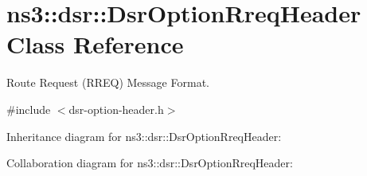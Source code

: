 \hypertarget{classns3_1_1dsr_1_1DsrOptionRreqHeader}{}\section{ns3\+:\+:dsr\+:\+:Dsr\+Option\+Rreq\+Header Class Reference}
\label{classns3_1_1dsr_1_1DsrOptionRreqHeader}


Route Request (R\+R\+EQ) Message Format.  




{\ttfamily \#include $<$dsr-\/option-\/header.\+h$>$}



Inheritance diagram for ns3\+:\+:dsr\+:\+:Dsr\+Option\+Rreq\+Header\+:


Collaboration diagram for ns3\+:\+:dsr\+:\+:Dsr\+Option\+Rreq\+Header\+:
